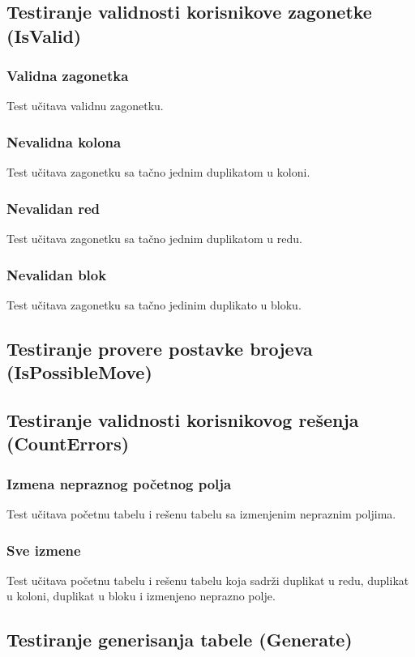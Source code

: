 \documentclass[a4paper]{article}
\begin{document}
    \subsection{Testiranje validnosti korisnikove zagonetke (IsValid)}
    
    \subsubsection{Validna zagonetka}
    Test učitava validnu zagonetku.
    \subsubsection{Nevalidna kolona}
    Test učitava zagonetku sa tačno jednim duplikatom u koloni. 
    \subsubsection{Nevalidan red}
    Test učitava zagonetku sa tačno jednim duplikatom u redu.
    \subsubsection{Nevalidan blok}
    Test učitava zagonetku sa tačno jedinim duplikato u bloku.
    
    \subsection{Testiranje provere postavke brojeva (IsPossibleMove)}

    \subsection{Testiranje validnosti korisnikovog rešenja (CountErrors)}
    \subsubsection{Izmena nepraznog početnog polja}
    Test učitava početnu tabelu i rešenu tabelu sa izmenjenim nepraznim poljima. 
    \subsubsection{Sve izmene}
    Test učitava početnu tabelu i rešenu tabelu koja sadrži duplikat u redu, duplikat u koloni, duplikat u bloku i izmenjeno neprazno polje.
    \subsection{Testiranje generisanja tabele (Generate)}
\end{document}
